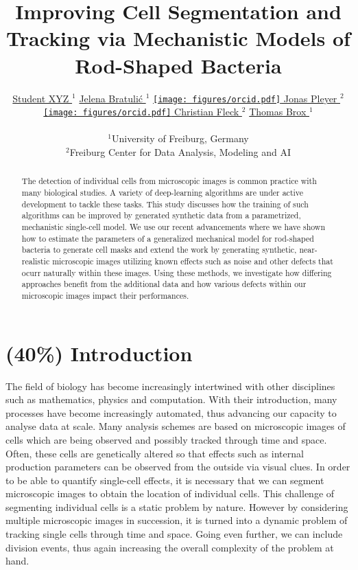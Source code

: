 \documentclass{article}
\title{Improving Cell Segmentation and Tracking via Mechanistic Models of
Rod-Shaped Bacteria}
\author{
    \href{https://orcid.org/0009-0001-0613-7978}{
        \hspace{1mm}Student XYZ
    }$^1$
    \href{https://orcid.org/0009-0001-0613-7978}{
        \hspace{1mm}Jelena Bratulić
    }$^1$
    \href{https://orcid.org/0009-0001-0613-7978}{
        \texttt{[image: figures/orcid.pdf]}
        \hspace{1mm}Jonas Pleyer
    }$^2$
	\href{https://orcid.org/0000-0002-6371-4495}{
        \texttt{[image: figures/orcid.pdf]}
        \hspace{1mm}Christian Fleck
    }$^2$
	\href{https://orcid.org/0000-0002-6371-4495}{
        \hspace{1mm}Thomas Brox
    }$^1$\\\\
    $^1$University of Freiburg, Germany\\
    $^2$Freiburg Center for Data Analysis, Modeling and AI\\
}
\begin{document}
\maketitle

\begin{abstract}
    The detection of individual cells from microscopic images is common practice with many
    biological studies.
    A variety of deep-learning algorithms are under active development to tackle these tasks.
    This study discusses how the training of such algorithms can be improved by generated synthetic
    data from a parametrized, mechanistic single-cell model.
    We use our recent advancements where we have shown how to estimate the parameters of a
    generalized mechanical model for rod-shaped bacteria to generate cell masks and extend the work
    by generating synthetic, near-realistic microscopic images utilizing known effects such as noise
    and other defects that ocurr naturally within these images.
    Using these methods, we investigate how differing approaches benefit from the additional data
    and how various defects within our microscopic images impact their performances.
\end{abstract}


\vfill
\pagebreak
\renewcommand{\contentsname}{Table of Contents (remove before submission)}
\tableofcontents
\vfill
\pagebreak

\section{(40\%) Introduction}

The field of biology has become increasingly intertwined with other disciplines such as mathematics,
physics and computation.
With their introduction, many processes have become increasingly automated, thus advancing our
capacity to analyse data at scale.
Many analysis schemes are based on microscopic images of cells which are being observed and possibly
tracked through time and space.
Often, these cells are genetically altered so that effects such as internal production parameters
can be observed from the outside via visual clues.
In order to be able to quantify single-cell effects, it is necessary that we can segment microscopic
images to obtain the location of individual cells.
This challenge of segmenting individual cells is a static problem by nature.
However by considering multiple microscopic images in succession, it is turned into a dynamic
problem of tracking single cells through time and space.
Going even further, we can include division events, thus again increasing the overall complexity of
the problem at hand.
\end{document}
